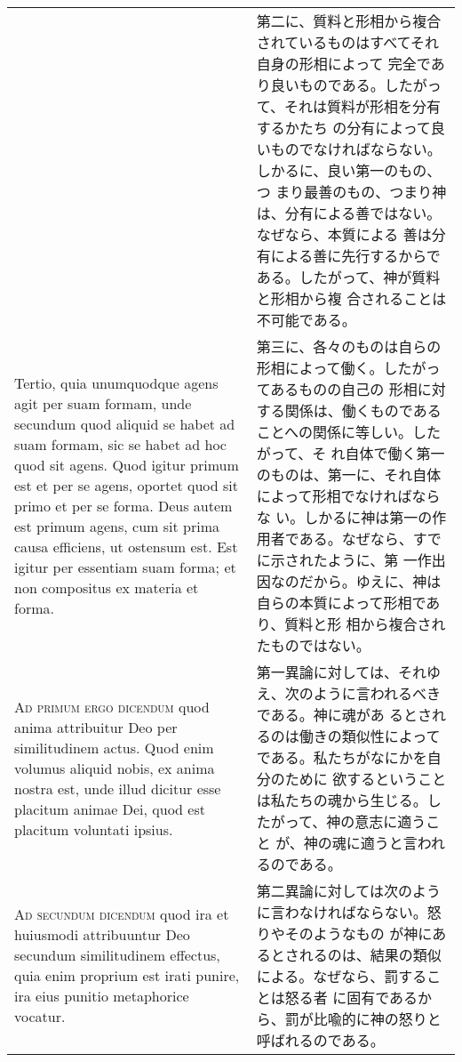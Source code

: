 \documentclass[10pt]{jsarticle}
\begin{document}
\begin{longtable}{p{21em}p{21em}}
&

第二に、質料と形相から複合されているものはすべてそれ自身の形相によって
完全であり良いものである。したがって、それは質料が形相を分有するかたち
の分有によって良いものでなければならない。しかるに、良い第一のもの、つ
まり最善のもの、つまり神は、分有による善ではない。なぜなら、本質による
善は分有による善に先行するからである。したがって、神が質料と形相から複
合されることは不可能である。
\\


Tertio, quia unumquodque agens agit per suam formam, unde secundum
quod aliquid se habet ad suam formam, sic se habet ad hoc quod sit
agens.  Quod igitur primum est et per se agens, oportet quod sit primo
et per se forma.  Deus autem est primum agens, cum sit prima causa
efficiens, ut ostensum est.  Est igitur per essentiam suam forma; et
non compositus ex materia et forma.

&


第三に、各々のものは自らの形相によって働く。したがってあるものの自己の
形相に対する関係は、働くものであることへの関係に等しい。したがって、そ
れ自体で働く第一のものは、第一に、それ自体によって形相でなければならな
い。しかるに神は第一の作用者である。なぜなら、すでに示されたように、第
一作出因なのだから。ゆえに、神は自らの本質によって形相であり、質料と形
相から複合されたものではない。

\\




\textsc{Ad primum ergo dicendum} quod anima attribuitur Deo per
similitudinem actus. Quod enim volumus aliquid nobis, ex anima nostra
est, unde illud dicitur esse placitum animae Dei, quod est placitum
voluntati ipsius.

&

第一異論に対しては、それゆえ、次のように言われるべきである。神に魂があ
るとされるのは働きの類似性によってである。私たちがなにかを自分のために
欲するということは私たちの魂から生じる。したがって、神の意志に適うこと
が、神の魂に適うと言われるのである。


\\

\textsc{Ad secundum dicendum} quod ira et huiusmodi attribuuntur Deo
secundum similitudinem effectus, quia enim proprium est irati punire,
ira eius punitio metaphorice vocatur.

&

第二異論に対しては次のように言わなければならない。怒りやそのようなもの
が神にあるとされるのは、結果の類似による。なぜなら、罰することは怒る者
に固有であるから、罰が比喩的に神の怒りと呼ばれるのである。



\end{longtable}
\end{document}
